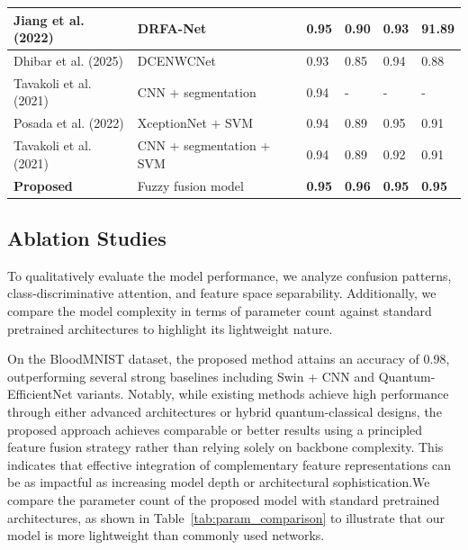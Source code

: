 \documentclass[preprint,12pt]{elsarticle}
\begin{document}
\begin{table}[!t]
{\begin{tabular}{|p{3.5cm}|p{4.1cm}|p{1.5cm}|p{1.5cm}|p{1.5cm}|p{1.5cm}|}


Jiang et al. (2022) & DRFA-Net & 0.95 & 0.90 & 0.93 & 91.89 \\ \hline
Dhibar et al. (2025) & DCENWCNet & 0.93 & 0.85 & 0.94 & 0.88 \\ \hline
Tavakoli et al. (2021) & CNN + segmentation & 0.94 & - & - & - \\ \hline
Posada et al. (2022) & XceptionNet + SVM & 0.94 & 0.89 & 0.95 & 0.91 \\ \hline
Tavakoli et al. (2021) & CNN + segmentation + SVM & 0.94 & 0.89 & 0.92 & 0.91 \\ \hline


\textbf{Proposed} & Fuzzy fusion model & \textbf{0.95} & \textbf{0.96} & \textbf{0.95} & \textbf{0.95} \\ \hline

\end{tabular}
}
\end{table}

\FloatBarrier
\subsection{Ablation Studies}
To qualitatively evaluate the model performance, we analyze confusion patterns, class-discriminative attention, and feature space separability. Additionally, we compare the model complexity in terms of parameter count against standard pretrained architectures to highlight its lightweight nature.



\FloatBarrier
On the BloodMNIST dataset, the proposed method attains an accuracy of 0.98, outperforming several strong baselines including Swin + CNN and Quantum-EfficientNet variants. Notably, while existing methods achieve high performance through either advanced architectures or hybrid quantum-classical designs, the proposed approach achieves comparable or better results using a principled feature fusion strategy rather than relying solely on backbone complexity. This indicates that effective integration of complementary feature representations can be as impactful as increasing model depth or architectural sophistication.We compare the parameter count of the proposed model with standard pretrained architectures, as shown in Table~\ref{tab:param_comparison} to illustrate that our model is more lightweight than commonly used networks.
\end{document}
